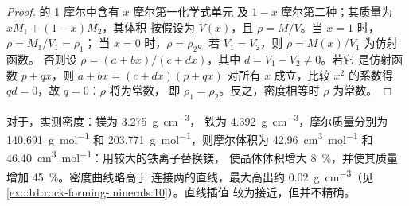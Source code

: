 \begin{proof}
的 1 摩尔中含有 $x$ 摩尔第一化学式单元
及 $1 - x$ 摩尔第二种；其质量为 $x M_1 + (1 - x) M_2$，其体积
按假设为 $V(x)$，且 $\rho = M/V$。当 $x = 1$ 时，$\rho = M_1/V_1 = \rho_1$；
当 $x = 0$ 时，$\rho = \rho_2$。若 $V_1 = V_2$，则 $\rho = M(x)/V_1$ 为仿射函数。
否则设 $\rho = (a + bx)/(c + dx)$，其中 $d = V_1 - V_2 \ne 0$。若它
是仿射函数 $p + qx$，则 $a + bx = (c + dx)(p + qx)$ 对所有 $x$ 成立，比较
$x^2$ 的系数得 $qd = 0$，故 $q = 0$：$\rho$ 将为常数，
即 $\rho_1 = \rho_2$。反之，密度相等时 $\rho$
为常数。
\end{proof}

对于，实测密度：镁为 \qty{3.275}{g.cm^{-3}}，
铁为 \qty{4.392}{g.cm^{-3}}，摩尔质量分别为
\qty{140.691}{g.mol^{-1}} 和 \qty{203.771}{g.mol^{-1}}，则摩尔体积为
\qty{42.96}{cm^3.mol^{-1}} 和 \qty{46.40}{cm^3.mol^{-1}}：用较大的铁离子替换镁，
使晶体体积增大 \qty{8}{\percent}，并使其质量
增加 \qty{45}{\percent}。密度曲线略高于
连接两的直线，最大高出约
\qty{0.02}{g.cm^{-3}}（见\cref{exo:b1:rock-forming-minerals:10}）。直线插值
较为接近，但并不精确。

